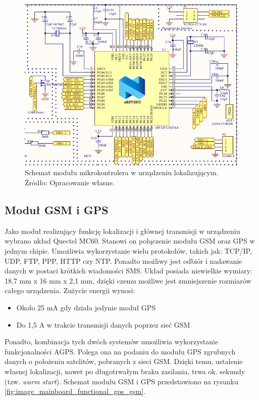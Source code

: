 \begin{figure}[H]
	\centering
	\includegraphics[width=15cm]{img/schematics/mainboard_functional_mcu.jpg}
	\caption{Schemat modułu mikrokontrolera w urządzeniu lokalizującym. \\ Źródło: Opracowanie własne.}
	\label{fig:image_mainboard_functional_mcu}
\end{figure}

\subsection{Moduł GSM i GPS}

Jako moduł realizujący funkcję lokalizacji i głównej transmisji w urządzeniu wybrano układ Quectel MC60. Stanowi on połączenie modułu GSM oraz GPS w jednym chipie. Umożliwia wykorzystanie wielu protokołów, takich jak: TCP/IP, UDP, FTP, PPP, HTTP czy NTP. Ponadto możliwy jest odbiór i nadawanie danych w postaci krótkich wiadomości SMS. Układ posiada niewielkie wymiary: 18,7 mm x 16 mm x 2,1 mm, dzięki czemu możliwe jest zmniejszenie rozmiarów całego urządzenia. Zużycie energii wynosi:
\begin{itemize}
\item Około 25 mA gdy działa jedynie moduł GPS
\item Do 1,5 A w trakcie transmisji danych poprzez sieć GSM
\end{itemize}

Ponadto, kombinacja tych dwóch systemów umożliwia wykorzystanie funkcjonalności AGPS. Polega ona na podaniu do modułu GPS zgrubnych danych o położeniu satelitów, pobranych z sieci GSM. Dzięki temu, ustalenie własnej lokalizacji, nawet po długotrwałym braku zasilania, trwa ok. sekundy (tzw. \textit{warm start}). Schemat modułu GSM i GPS przedstawiono na rysunku \ref{fig:image_mainboard_functional_gps_gsm}.

